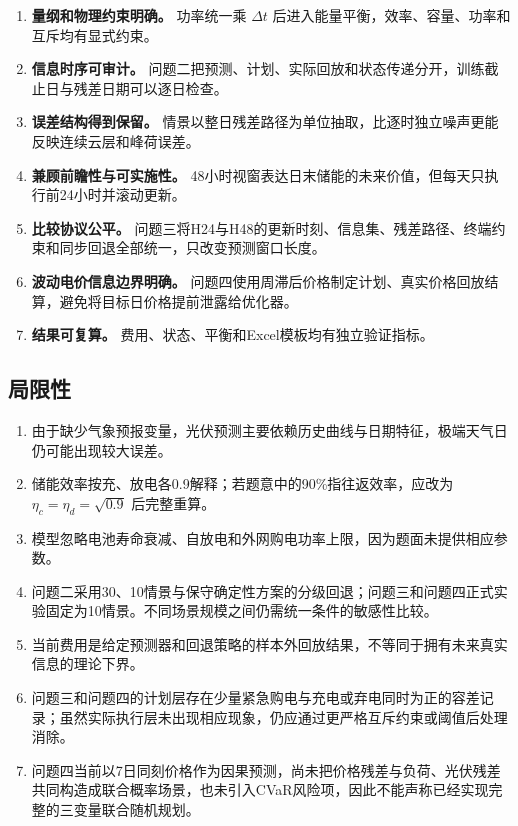 \documentclass[UTF8,12pt,a4paper]{ctexart}
\begin{document}
\begin{enumerate}
  \item \textbf{量纲和物理约束明确。} 功率统一乘 $\Delta t$ 后进入能量平衡，效率、容量、功率和互斥均有显式约束。
  \item \textbf{信息时序可审计。} 问题二把预测、计划、实际回放和状态传递分开，训练截止日与残差日期可以逐日检查。
  \item \textbf{误差结构得到保留。} 情景以整日残差路径为单位抽取，比逐时独立噪声更能反映连续云层和峰荷误差。
  \item \textbf{兼顾前瞻性与可实施性。} 48小时视窗表达日末储能的未来价值，但每天只执行前24小时并滚动更新。
  \item \textbf{比较协议公平。} 问题三将H24与H48的更新时刻、信息集、残差路径、终端约束和同步回退全部统一，只改变预测窗口长度。
  \item \textbf{波动电价信息边界明确。} 问题四使用周滞后价格制定计划、真实价格回放结算，避免将目标日价格提前泄露给优化器。
  \item \textbf{结果可复算。} 费用、状态、平衡和Excel模板均有独立验证指标。
\end{enumerate}

\subsection{局限性}

\begin{enumerate}
  \item 由于缺少气象预报变量，光伏预测主要依赖历史曲线与日期特征，极端天气日仍可能出现较大误差。
  \item 储能效率按充、放电各0.9解释；若题意中的90\%指往返效率，应改为 $\eta_c=\eta_d=\sqrt{0.9}$ 后完整重算。
  \item 模型忽略电池寿命衰减、自放电和外网购电功率上限，因为题面未提供相应参数。
  \item 问题二采用30、10情景与保守确定性方案的分级回退；问题三和问题四正式实验固定为10情景。不同场景规模之间仍需统一条件的敏感性比较。
  \item 当前费用是给定预测器和回退策略的样本外回放结果，不等同于拥有未来真实信息的理论下界。
  \item 问题三和问题四的计划层存在少量紧急购电与充电或弃电同时为正的容差记录；虽然实际执行层未出现相应现象，仍应通过更严格互斥约束或阈值后处理消除。
  \item 问题四当前以7日同刻价格作为因果预测，尚未把价格残差与负荷、光伏残差共同构造成联合概率场景，也未引入CVaR风险项，因此不能声称已经实现完整的三变量联合随机规划。
\end{enumerate}
\end{document}
